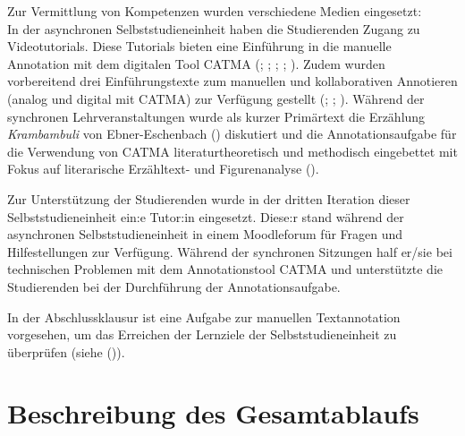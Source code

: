 \documentclass[
          a4paper,
        ]{article}
\begin{document}
Zur Vermittlung von Kompetenzen wurden verschiedene Medien eingesetzt:\\
In der asynchronen Selbststudieneinheit haben die Studierenden Zugang zu
Videotutorials. Diese Tutorials bieten eine Einführung in die manuelle
Annotation mit dem digitalen Tool CATMA
(;
;
;
;
). Zudem wurden
vorbereitend drei Einführungstexte zum manuellen und kollaborativen
Annotieren (analog und digital mit CATMA) zur Verfügung gestellt
(;
;
). Während der synchronen Lehrveranstaltungen wurde als kurzer
Primärtext die Erzählung \emph{Krambambuli} von Ebner-Eschenbach
() diskutiert und
die Annotationsaufgabe für die Verwendung von CATMA literaturtheoretisch
und methodisch eingebettet mit Fokus auf literarische Erzähltext- und
Figurenanalyse ().

Zur Unterstützung der Studierenden wurde in der dritten Iteration dieser
Selbststudieneinheit ein:e Tutor:in eingesetzt. Diese:r stand während
der asynchronen Selbststudieneinheit in einem Moodleforum für Fragen und
Hilfestellungen zur Verfügung. Während der synchronen Sitzungen half
er/sie bei technischen Problemen mit dem Annotationstool CATMA und
unterstützte die Studierenden bei der Durchführung der
Annotationsaufgabe.

In der Abschlussklausur ist eine Aufgabe zur manuellen Textannotation
vorgesehen, um das Erreichen der Lernziele der Selbststudieneinheit zu
überprüfen (siehe ()).

\section{Beschreibung des
Gesamtablaufs}\label{beschreibung-des-gesamtablaufs}
\end{document}
